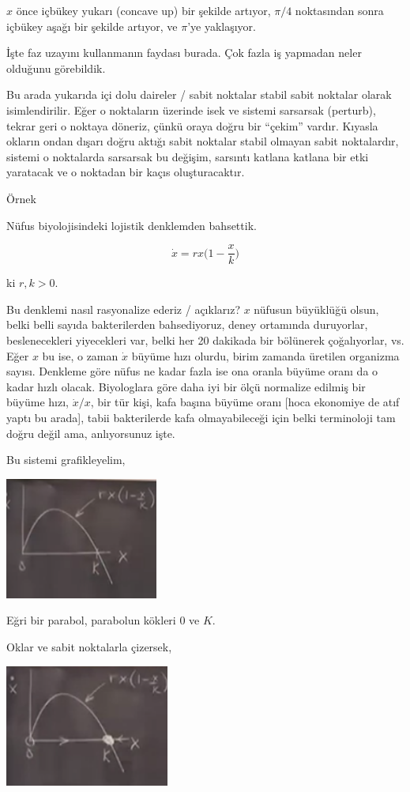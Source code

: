 \documentclass[12pt,fleqn]{article}\usepackage{../../common}
\begin{document}
$x$ önce içbükey yukarı (concave up) bir şekilde artıyor, $\pi/4$
noktasından sonra içbükey aşağı bir şekilde artıyor, ve $\pi$'ye
yaklaşıyor. 

İşte faz uzayını kullanmanın faydası burada. Çok fazla iş yapmadan neler
olduğunu görebildik. 

Bu arada yukarıda içi dolu daireler / sabit noktalar stabil sabit noktalar
olarak isimlendirilir. Eğer o noktaların üzerinde isek ve sistemi sarsarsak
(perturb), tekrar geri o noktaya döneriz, çünkü oraya doğru bir ``çekim''
vardır. Kıyasla okların ondan dışarı doğru aktığı sabit noktalar stabil
olmayan sabit noktalardır, sistemi o noktalarda sarsarsak bu değişim,
sarsıntı katlana katlana bir etki yaratacak ve o noktadan bir kaçıs
oluşturacaktır.

Örnek

Nüfus biyolojisindeki lojistik denklemden bahsettik. 

$$
\dot{x} = rx \big( 1- \frac{x}{k}\big)
$$

ki $r,k > 0$. 

Bu denklemi nasıl rasyonalize ederiz / açıklarız? $x$ nüfusun büyüklüğü
olsun, belki belli sayıda bakterilerden bahsediyoruz, deney ortamında
duruyorlar, beslenecekleri yiyecekleri var, belki her 20 dakikada bir
bölünerek çoğalıyorlar, vs. Eğer $x$ bu ise, o zaman $\dot{x}$ büyüme hızı
olurdu, birim zamanda üretilen organizma sayısı. Denkleme göre nüfus ne
kadar fazla ise ona oranla büyüme oranı da o kadar hızlı
olacak. Biyologlara göre daha iyi bir ölçü normalize edilmiş bir büyüme
hızı, $\dot{x}/x$, bir tür kişi, kafa başına büyüme oranı [hoca ekonomiye
de atıf yaptı bu arada], tabii bakterilerde kafa olmayabileceği için belki
terminoloji tam doğru değil ama, anlıyorsunuz işte.  

Bu sistemi grafikleyelim, 

\includegraphics[height=4cm]{1_08.png}

Eğri bir parabol, parabolun kökleri 0 ve $K$. 

Oklar ve sabit noktalarla çizersek, 

\includegraphics[height=4cm]{1_09.png}
\end{document}
